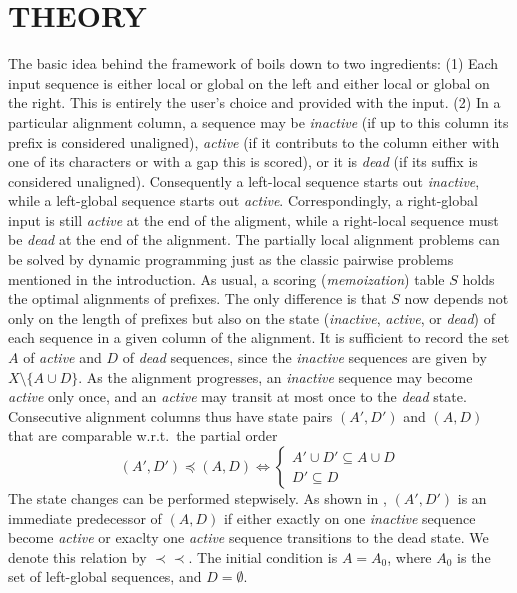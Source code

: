 \documentclass[a4paper,10pt]{article}
\newcommand{\pprec}{\mathrel{\prec\!\!\!\prec}}
\begin{document}
\section{\uppercase{Theory}}

The basic idea behind the framework of \citet{Retzlaff:18a} boils down to
two ingredients: (1) Each input sequence is either local or global on the
left and either local or global on the right. This is entirely the user's
choice and provided with the input. (2) In a particular alignment column, a
sequence may be \textit{inactive} (if up to this column its prefix is
considered unaligned), \textit{active} (if it contributs to the column
either with one of its characters or with a gap this is scored), or it is
\textit{dead} (if its suffix is considered unaligned). Consequently a
left-local sequence starts out \textit{inactive}, while a left-global
sequence starts out \textit{active}. Correspondingly, a right-global input
is still \textit{active} at the end of the aligment, while a right-local
sequence must be \textit{dead} at the end of the alignment. The partially
local alignment problems can be solved by dynamic programming just as the
classic pairwise problems mentioned in the introduction. As usual, a
scoring (\emph{memoization}) table $S$ holds the optimal alignments of
prefixes. The only difference is that $S$ now depends not only on the
length of prefixes but also on the state (\textit{inactive},
\textit{active}, or \textit{dead}) of each sequence in a given column of
the alignment. It is sufficient to record the set $A$ of \textit{active}
and $D$ of \textit{dead} sequences, since the \emph{inactive} sequences are
given by $X\setminus\{A \cup D\}$.  As the alignment progresses, an
\textit{inactive} sequence may become \textit{active} only once, and an
\textit{active} may transit at most once to the \textit{dead}
state. Consecutive alignment columns thus have state pairs $(A',D')$ and
$(A,D)$ that are comparable w.r.t.\ the partial order
\begin{equation}
  (A',D')\preceq(A,D) \iff
    \begin{cases} A'\cup D'\subseteq A\cup D \\
      D'\subseteq D
    \end{cases}
\end{equation}
The state changes can be performed stepwisely. As shown in
\cite{Retzlaff:18a}, $(A',D')$ is an immediate predecessor of $(A,D)$ if
either exactly on one \textit{inactive} sequence become \textit{active} or
exaclty one \textit{active} sequence transitions to the dead state.  We
denote this relation by $\pprec$. The initial condition is $A=A_0$, where
$A_0$ is the set of left-global sequences, and $D=\emptyset$.
\end{document}
